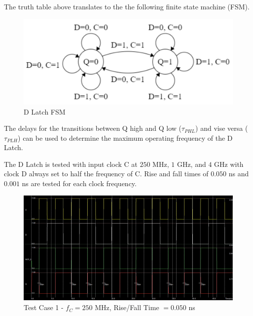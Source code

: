 \FloatBarrier

The truth table above translates to the the following finite state machine (FSM).

\FloatBarrier

\begin{figure}[h!]
	\centering
	\includegraphics[scale=0.70]{../images/dlatch_fsm.PNG}
	\caption{D Latch FSM}
	\label{fig:dlatch_fsm}
\end{figure}

\FloatBarrier

The delays for the transitions between Q high and Q low ($\tau_{PHL}$) and vise versa ($\tau_{PLH}$) can be used to determine the maximum operating frequency of the D Latch.

The D Latch is tested with input clock C at $250$ \si{\mega\hertz}, $1$ \si{\giga\hertz}, and $4$ \si{\giga\hertz} with clock D always set to half the frequency of C.
Rise and fall times of $0.050$ \si{\nano\second} and $0.001$ \si{\nano\second} are tested for each clock frequency.

\FloatBarrier

\begin{figure}[h!]
	\centering
	\includegraphics[scale=0.30]{../images/test_inputs_from_manual.PNG}
	\caption{Test Case 1 - $f_C = 250$ \si{\mega\hertz}, Rise/Fall Time $= 0.050$ \si{\nano\second}}
	\label{fig:layout_test_1}
\end{figure}


